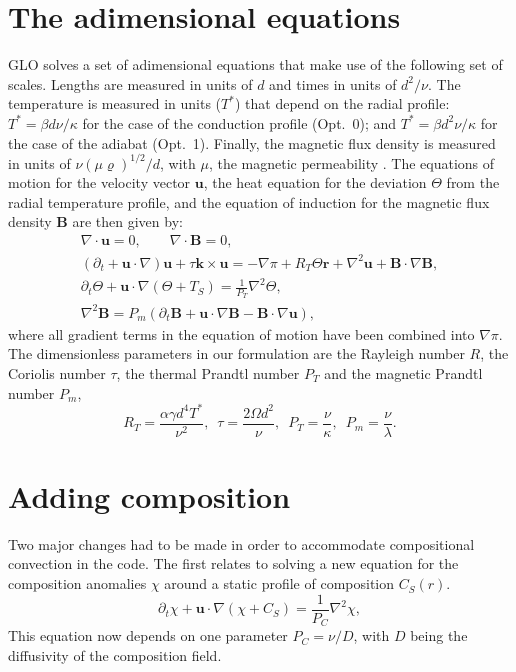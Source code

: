 \documentclass[a4paper,10pt]{book}
\renewcommand{\vec}[1]{\mathbf{#1}}
\begin{document}
\section{The adimensional equations}
GLO solves a set of adimensional equations that make use of the following set of
scales. Lengths are measured in units of $d$ and times in units of $d^2 / \nu$.
The temperature is measured in units ($T^*$) that depend on the radial profile:
$T^* = \beta d \nu/\kappa$ for the case of the conduction profile (Opt.~0); and
$T^* = \beta d^2 \nu/\kappa$ for the case of the adiabat (Opt.~1). Finally, the
magnetic flux density is measured in units of $\nu ( \mu \varrho )^{1/2} /d$,
with $\mu$, the magnetic permeability \citep{ArdesEtAl97}. The equations of
motion for the velocity vector $\vec u$, the heat equation for the deviation
$\Theta$ from the radial temperature profile, and the equation of induction for
the magnetic flux density $\vec B$ are then given by:
\begin{subequations}
\begin{gather}
\label{e:nonDivergence}
\nabla \cdot \vec u = 0, \qquad \nabla \cdot \vec B = 0, \\
\label{e:NavierStokes}
(\partial_t + \vec u \cdot \nabla )\vec u + \tau \vec k \times
\vec u = - \nabla \pi + R_T \Theta \vec{r} + \nabla^2 \vec u + \vec B \cdot
\nabla \vec B, \\
\label{e:temperature}
\partial_t \Theta + \vec u \cdot \nabla (\Theta+T_S) = \frac{1}{P_T} \nabla^2 \Theta, \\
\label{e:induction}
\nabla^2 \vec B =  P_m(\partial_t \vec B + \vec u \cdot \nabla \vec B
-  \vec B \cdot \nabla \vec u),
\end{gather}
\end{subequations}
where all gradient terms in the equation of motion have been combined into
$\nabla \pi$. The dimensionless parameters in our formulation are the Rayleigh
number $R$, the Coriolis number $\tau$, the thermal Prandtl number $P_T$ and the
magnetic Prandtl number $P_m$,
\begin{equation}
R_T = \frac{\alpha \gamma d^4 T^*}{\nu^2} ,
\enspace \tau = \frac{2
\Omega d^2}{\nu} , \enspace P_T = \frac{\nu}{\kappa} , \enspace P_m =
\frac{\nu}{\lambda}.
\end{equation}

\section{Adding composition}
Two major changes had to be made in order to accommodate compositional
convection in the code. The first relates to solving a new equation for the
composition anomalies $\chi$ around a static profile of composition $C_S(r)$.
\begin{equation}
\partial_t \chi  + \vec u \cdot \nabla (\chi+C_S) = \frac{1}{P_C} \nabla^2 \chi,
\label{e:composition}
\end{equation}
This equation now depends on one parameter $P_C=\nu/D$, with $D$
being the diffusivity of the composition field.
\end{document}
